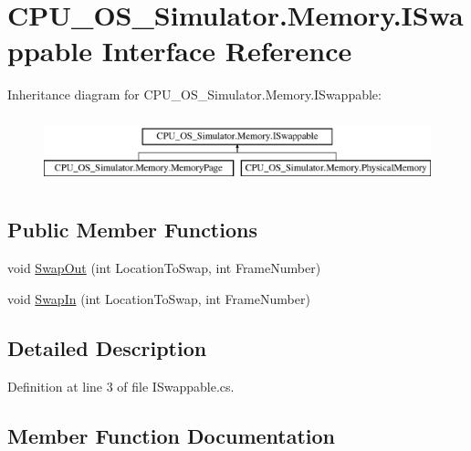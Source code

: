 \hypertarget{interface_c_p_u___o_s___simulator_1_1_memory_1_1_i_swappable}{}\section{C\+P\+U\+\_\+\+O\+S\+\_\+\+Simulator.\+Memory.\+I\+Swappable Interface Reference}
\label{interface_c_p_u___o_s___simulator_1_1_memory_1_1_i_swappable}
Inheritance diagram for C\+P\+U\+\_\+\+O\+S\+\_\+\+Simulator.\+Memory.\+I\+Swappable\+:\begin{figure}[H]
\begin{center}
\leavevmode
\includegraphics[height=2.000000cm]{interface_c_p_u___o_s___simulator_1_1_memory_1_1_i_swappable}
\end{center}
\end{figure}
\subsection*{Public Member Functions}
\begin{DoxyCompactItemize}
\item 
void \hyperlink{interface_c_p_u___o_s___simulator_1_1_memory_1_1_i_swappable_ae789e9deb0600d48b0dcbe4a4252220a}{Swap\+Out} (int Location\+To\+Swap, int Frame\+Number)
\item 
void \hyperlink{interface_c_p_u___o_s___simulator_1_1_memory_1_1_i_swappable_a38e30363486a3de53e6171da50b943af}{Swap\+In} (int Location\+To\+Swap, int Frame\+Number)
\end{DoxyCompactItemize}


\subsection{Detailed Description}


Definition at line 3 of file I\+Swappable.\+cs.



\subsection{Member Function Documentation}
\hypertarget{interface_c_p_u___o_s___simulator_1_1_memory_1_1_i_swappable_a38e30363486a3de53e6171da50b943af}{}
